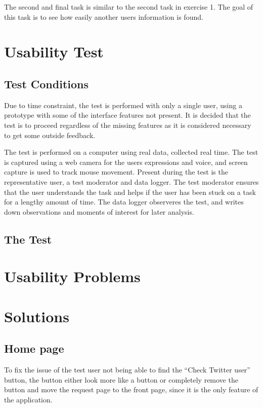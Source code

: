 The second and final task is similar to the second task in exercise 1. The goal
of this task is to see how easily another users information is found.


\section{Usability Test}


\subsection{Test Conditions}
Due to time constraint, the test is performed with only a single user,
using a prototype with some of the interface features not present. It is
decided that the test is to proceed regardless of the missing features as it
is considered necessary to get some outside feedback.\nl

The test is performed on a computer using real data, collected real time. The
test is captured using a web camera for the users expressions and voice, and
screen capture is used to track mouse movement. Present during the test is the
representative user, a test moderator and data logger. The test moderator
ensures that the user understands the task and helps if the user has been stuck
on a task for a lengthy amount of time. The data logger observeres the test,
and writes down observations and moments of interest for later analysis.

\subsection{The Test}

\section{Usability Problems}

\section{Solutions}

\subsection{Home page}
To fix the issue of the test user not being able to find the ``Check Twitter
user'' button, the button either look more like a button or completely remove
the button and move the request page to the front page, since it is the only
feature of the application.

